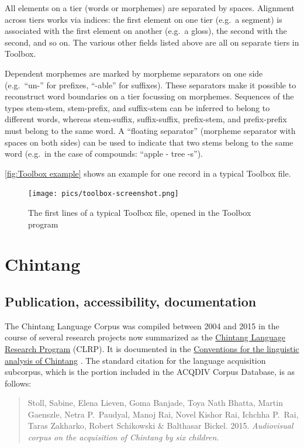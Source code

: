 \documentclass[a4paper, 11pt]{book}
\begin{document}
All elements on a tier (words or morphemes) are separated by spaces. Alignment across tiers works via indices: the first element on one tier (e.g.\ a segment) is associated with the first element on another (e.g.\ a gloss), the second with the second, and so on. The various other fields listed above are all on separate tiers in Toolbox.

Dependent morphemes are marked by morpheme separators on one side (e.g.\ “un-” for prefixes, “-able” for suffixes). These separators make it possible to reconstruct word boundaries on a tier focussing on morphemes. Sequences of the types stem-stem, stem-prefix, and suffix-stem can be inferred to belong to different words,  whereas stem-suffix, suffix-suffix, prefix-stem, and prefix-prefix must belong to the same word. A “floating separator” (morpheme separator with spaces on both sides) can be used to indicate that two stems belong to the same word (e.g.\ in the case of compounds: “apple - tree -s”). 

\autoref{fig:Toolbox example} shows an example for one record in a typical Toolbox file. 

\begin{figure}[ht!]
	\centering
	\texttt{[image: pics/toolbox-screenshot.png]}
	\caption{The first lines of a typical Toolbox file, opened in the Toolbox program}
	\label{fig:Toolbox example}
\end{figure}


\section{Chintang}
\label{sec:Chintang}

\subsection{Publication, accessibility, documentation}
The Chintang Language Corpus \citep{Stoll_etal2015b} was compiled between 2004 and 2015 in the course of several research projects now summarized as the \href{http://www.clrp.uzh.ch}{Chintang Language Research Program} (CLRP). It is documented in the \href{http://spwarran.uzh.ch/chintangwiki/index.php/Conventions_for_the_linguistic_analysis_of_Chintang}{Conventions for the linguistic analysis of Chintang} \citep{Schikowski2015a}. The standard citation for the language acquisition subcorpus, which is the portion included in the ACQDIV Corpus Database, is as follows: 

\begin{quote}
	Stoll, Sabine, Elena Lieven, Goma Banjade, Toya Nath Bhatta, Martin Gaenszle, Netra P.\ Paudyal, Manoj Rai, Novel Kishor Rai, 
	Ichchha P.\ Rai, Taras Zakharko, Robert Schikowski \& Balthasar Bickel. 2015. \emph{Audiovisual corpus on the acquisition of Chintang by six children.} %
\end{quote}
\end{document}
